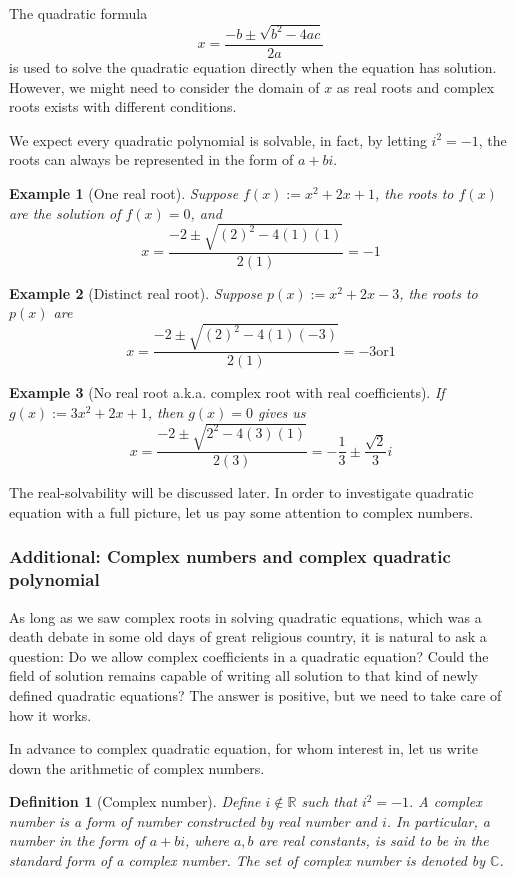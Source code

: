 \documentclass[12pt]{article}
\newtheorem{definition}{Definition}[section]
\newtheorem*{example}{Example}
\begin{document}
    The quadratic formula $$x=\frac{-b\pm\sqrt{b^2-4ac}}{2a}$$ is used to solve the quadratic equation directly when the equation has solution. However, we might need to consider the domain of $x$ as real roots and complex roots exists with different conditions.

    We expect every quadratic polynomial is solvable, in fact, by letting $i^2=-1$, the roots can always be represented in the form of $a+bi$.

    \begin{example}[One real root]
        Suppose $f(x):=x^2+2x+1$, the roots to $f(x)$ are the solution of $f(x)=0$, and \[x=\frac{-2\pm\sqrt{(2)^2-4(1)(1)}}{2(1)}=-1\]
    \end{example}

    \begin{example}[Distinct real root]
        Suppose $p(x):=x^2+2x-3$, the roots to $p(x)$ are  \[x=\frac{-2\pm\sqrt{(2)^2-4(1)(-3)}}{2(1)}=-3 \mathrm{ or } 1\]
    \end{example}

    \begin{example}[No real root a.k.a. complex root with real coefficients]
        If $g(x):=3x^2+2x+1$, then $g(x)=0$ gives us \[x=\frac{-2\pm\sqrt{2^2-4(3)(1)}}{2(3)}=-\frac{1}{3}\pm\frac{\sqrt{2}}{3}i\]
    \end{example}

    The real-solvability will be discussed later. In order to investigate quadratic equation with a full picture, let us pay some attention to complex numbers.

    \subsubsection*{Additional: Complex numbers and complex quadratic polynomial}

    As long as we saw complex roots in solving quadratic equations, which was a death debate in some old days of great religious country, it is natural to ask a question: Do we allow complex coefficients in a quadratic equation? Could the field of solution remains capable of writing all solution to that kind of newly defined quadratic equations? The answer is positive, but we need to take care of how it works.

    In advance to complex quadratic equation, for whom interest in, let us write down the arithmetic of complex numbers.

    \begin{definition}[Complex number]
        Define $i\notin\mathbb{R}$ such that $i^2=-1$. A complex number is a form of number constructed by real number and $i$. In particular, a number in the form of $a+bi$, where $a,b$ are real constants, is said to be in the standard form of a complex number. The set of complex number is denoted by $\mathbb{C}$.
    \end{definition}
\end{document}
